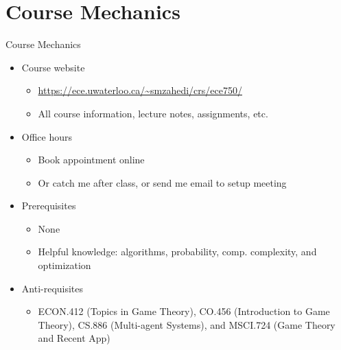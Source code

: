 \documentclass[11pt,aspectratio=169,handout]{beamer}
\subtitle{\vspace{2.1em}Lecture 1: Introduction}
\begin{document}
 \begin{frame}[plain]
  \titlepage
 \end{frame}
 
 \section{Course Mechanics}
  \begin{frame}{Course Mechanics}
   \begin{itemize}[<+->]
    \setlength{\itemsep}{1em}
    \item Course website
    \begin{itemize}[<.->]
     \item \href{https://ece.uwaterloo.ca/~smzahedi/crs/ece750}{\url{https://ece.uwaterloo.ca/~smzahedi/crs/ece750/}}
     \item All course information, lecture notes, assignments, etc.  
    \end{itemize}   
    \item Office hours
    \begin{itemize}[<.->]
     \item Book appointment online
     \item Or catch me after class, or send me email to setup meeting
    \end{itemize}
    \item Prerequisites 
    \begin{itemize}[<.->]
    	 \item None
     \item Helpful knowledge: algorithms, probability, comp. complexity, and optimization
    \end{itemize} 
    \item Anti-requisites 
    \begin{itemize}[<.->]
     \item ECON.412 (Topics in Game Theory), CO.456 (Introduction to Game Theory), CS.886 (Multi-agent Systems), and MSCI.724 (Game Theory and Recent App)
    \end{itemize} 
   \end{itemize}
  \end{frame}
 
\end{document}
